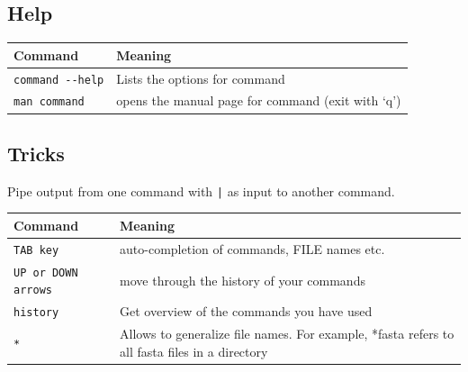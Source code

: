 \documentclass[11pt]{article}
\begin{document}
\subsection{Help}
\label{sec-7-6}


\begin{center}
\begin{tabular}{ll}
 Command                    &  Meaning                                            \\
\hline
 \texttt{command -{}-help}  &  Lists the options for command                      \\
\hline
 \texttt{man command}       &  opens the manual page for command (exit with `q')  \\
\end{tabular}
\end{center}
\subsection{Tricks}
\label{sec-7-7}


Pipe output from one command with \texttt{|} as input to another command.


\begin{center}
\begin{tabular}{ll}
 Command                     &  Meaning                                                                                        \\
\hline
 \texttt{TAB key}            &  auto-completion of commands, FILE names etc.                                                   \\
\hline
 \texttt{UP or DOWN arrows}  &  move through the history of your commands                                                      \\
\hline
 \texttt{history}            &  Get overview of the commands you have used                                                     \\
\hline
 \texttt{*}                  &  Allows to generalize file names. For example, *fasta refers to all fasta files in a directory  \\
\end{tabular}
\end{center}
\end{document}
